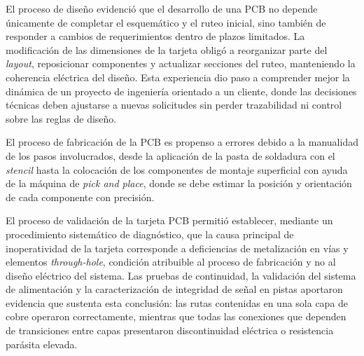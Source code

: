 \documentclass[journal,trans]{IEEEtran}
\begin{document}

El proceso de diseño evidenció que el desarrollo de una PCB no depende únicamente de completar el esquemático y el ruteo inicial, sino también de responder a cambios de requerimientos dentro de plazos limitados. La modificación de las dimensiones de la tarjeta obligó a reorganizar parte del \textit{layout}, reposicionar componentes y actualizar secciones del ruteo, manteniendo la coherencia eléctrica del diseño. Esta experiencia dio paso a comprender mejor la dinámica de un proyecto de ingeniería orientado a un cliente, donde las decisiones técnicas deben ajustarse a nuevas solicitudes sin perder trazabilidad ni control sobre las reglas de diseño.

El proceso de fabricación de la PCB es propenso a errores debido a la manualidad de los pasos involucrados,
desde la aplicación de la pasta de soldadura con el \textit{stencil} hasta la colocación de los componentes de montaje superficial
con ayuda de la máquina de \textit{pick and place}, donde se debe estimar la posición y orientación de cada componente con precisión.

El proceso de validación de la tarjeta PCB permitió establecer, mediante un procedimiento
sistemático de diagnóstico, que la causa principal de inoperatividad de la tarjeta
corresponde a deficiencias de metalización en vías y elementos \textit{through-hole},
condición atribuible al proceso de fabricación y no al diseño eléctrico del sistema.
Las pruebas de continuidad, la validación del sistema de alimentación y la caracterización
de integridad de señal en pistas aportaron evidencia que sustenta esta
conclusión: las rutas contenidas en una sola capa de cobre operaron correctamente, mientras
que todas las conexiones que dependen de transiciones entre capas presentaron discontinuidad
eléctrica o resistencia parásita elevada.
\end{document}

